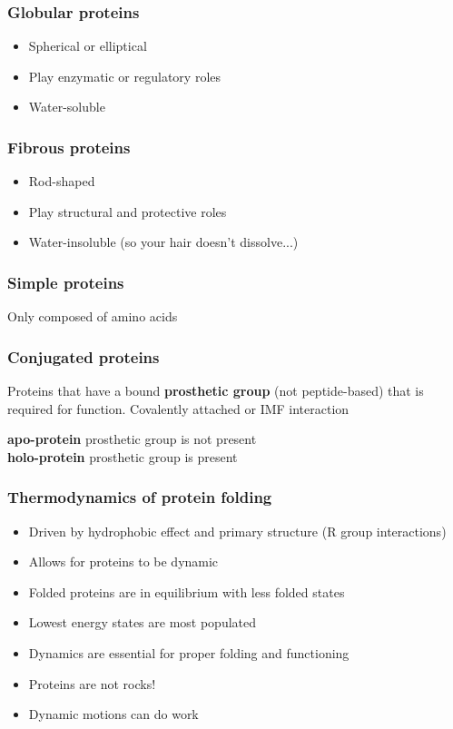 \documentclass[letterpaper, 12pt]{article}
\begin{document}
\subsubsection*{Globular proteins}

\begin{itemize}
\item Spherical or elliptical
\item Play enzymatic or regulatory roles
\item Water-soluble
\end{itemize}

\subsubsection*{Fibrous proteins}

\begin{itemize}
\item Rod-shaped
\item Play structural and protective roles
\item Water-insoluble (so your hair doesn't dissolve...)
\end{itemize}

\subsubsection*{Simple proteins}
Only composed of amino acids

\subsubsection*{Conjugated proteins}
Proteins that have a bound \textbf{prosthetic group} (not peptide-based) that is required for function. Covalently attached or IMF interaction

\textbf{apo-protein} prosthetic group is not present \\
\textbf{holo-protein} prosthetic group is present

\subsubsection*{Thermodynamics of protein folding}

\begin{itemize}
\item Driven by hydrophobic effect and primary structure (R group interactions)
\item Allows for proteins to be dynamic
\item Folded proteins are in equilibrium with less folded states
\item Lowest energy states are most populated
\item Dynamics are essential for proper folding and functioning
\item Proteins are not rocks!
\item Dynamic motions can do work
\end{itemize}
\end{document}
